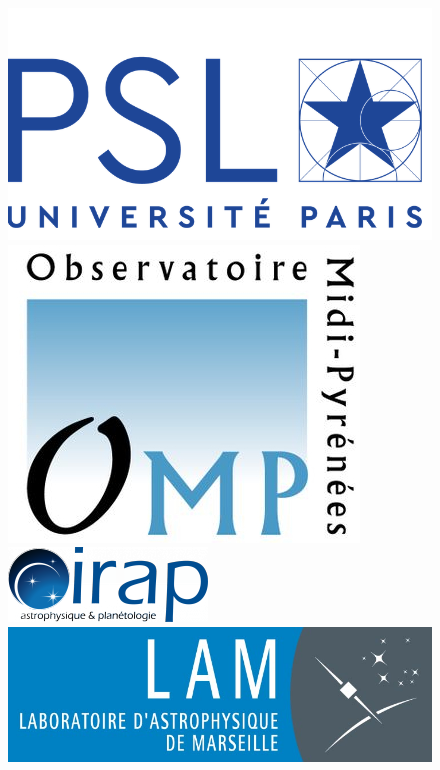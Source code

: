 \begin{titlepage}
\begin{center}
        \begin{figure}[htbp]
             \centering
             \vspace{.25cm}
             \includegraphics[width=.25\linewidth]{./Figures/psl_logo.png}
             \hspace{35pt}
             \includegraphics[width=.17\linewidth]{./Figures/omp_logo.jpg} \\
             \vspace{.25cm}
             \hspace{35pt}
             \includegraphics[width=.25\linewidth]{./Figures/irap_logo.png}
             \hspace{35pt}
             \includegraphics[width=.25\linewidth]{./Figures/Logo_LAM_petit.jpg}
        \end{figure}

    \end{center}
\end{titlepage}
\makeatother
\afterpage{\blankpage}